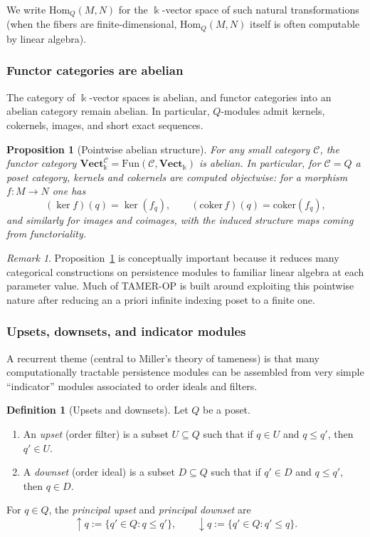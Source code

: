 \documentclass{article}
\newcommand{\kk}{\Bbbk}
\newcommand{\<}{\langle}
\renewcommand{\>}{\rangle}
\newtheorem*{proposition}{Proposition}
\theoremstyle{definition}
\newtheorem{defn}[theorem]{Definition}
\theoremstyle{remark}
\newtheorem*{remark}{Remark}
\begin{document}
	We write $\mathrm{Hom}_Q(M,N)$ for the $\kk$-vector space of such natural
	transformations (when the fibers are finite-dimensional, $\mathrm{Hom}_Q(M,N)$
	itself is often computable by linear algebra).
	
	\subsubsection*{Functor categories are abelian}
	
	The category of $\kk$-vector spaces is abelian, and functor categories into an
	abelian category remain abelian.  In particular, $Q$-modules admit kernels,
	cokernels, images, and short exact sequences.
	
	\begin{proposition}[Pointwise abelian structure]\label{prop:functor-category-abelian}
		For any small category $\mathcal{C}$, the functor category
		$\mathbf{Vect}_{\kk}^{\mathcal{C}}=\mathrm{Fun}(\mathcal{C},\mathbf{Vect}_{\kk})$
		is abelian.  In particular, for $\mathcal{C}=Q$ a poset category, kernels and
		cokernels are computed \emph{objectwise}: for a morphism $f\colon M\to N$ one has
		\[
		(\ker f)(q)=\ker(f_q),\qquad (\mathrm{coker}\,f)(q)=\mathrm{coker}(f_q),
		\]
		and similarly for images and coimages, with the induced structure maps coming from
		functoriality.
	\end{proposition}
	
	\begin{remark}
		Proposition~\ref{prop:functor-category-abelian} is conceptually important because it
		reduces many categorical constructions on persistence modules to familiar linear
		algebra at each parameter value.  Much of TAMER-OP is built around exploiting this
		pointwise nature after reducing an a priori infinite indexing poset to a finite one.
	\end{remark}
	
	\subsubsection*{Upsets, downsets, and indicator modules}
	
	A recurrent theme (central to Miller's theory of tameness) is that many
	computationally tractable persistence modules can be assembled from very simple
	``indicator'' modules associated to order ideals and filters.
	
	\begin{defn}[Upsets and downsets]\label{def:upset-downset}
		Let $Q$ be a poset.
		\begin{enumerate}[label=(\roman*)]
			\item An \emph{upset} (order filter) is a subset $U\subseteq Q$ such that if
			$q\in U$ and $q\leq q'$, then $q'\in U$.
			\item A \emph{downset} (order ideal) is a subset $D\subseteq Q$ such that if
			$q'\in D$ and $q\leq q'$, then $q\in D$.
		\end{enumerate}
		For $q\in Q$, the \emph{principal upset} and \emph{principal downset} are
		\[
		\uparrow q := \{q'\in Q : q\leq q'\},\qquad
		\downarrow q := \{q'\in Q : q'\leq q\}.
		\]
	\end{defn}
	
\end{document}
